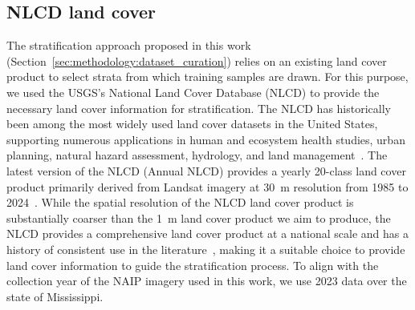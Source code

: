 


\subsection{NLCD land cover}\label{sec:data:nlcd}

The stratification approach proposed in this work (Section~\ref{sec:methodology:dataset_curation}) relies on an existing land cover product to select strata from which training samples are drawn.
For this purpose, we used the USGS's National Land Cover Database (NLCD) to provide the necessary land cover information for stratification. 
The NLCD has historically been among the most widely used land cover datasets in the United States, supporting numerous applications in human and ecosystem health studies, urban planning, natural hazard assessment, hydrology, and land management~\citep{sohlThirtyYearsUS2025}.
The latest version of the NLCD (Annual NLCD) provides a yearly 20-class land cover product primarily derived from Landsat imagery at \SI{30}{\meter} resolution from 1985 to 2024~\citep{unitedstatesgeologicalsurveyAnnualNationalLand2025}.
While the spatial resolution of the NLCD land cover product is substantially coarser than the \SI{1}{\meter} land cover product we aim to produce, the NLCD provides a comprehensive land cover product at a national scale and has a history of consistent use in the literature~\citep{yangNewGenerationUnited2018, blackardMappingUSForest2008,netzelPatternBasedAssessmentLand2015}, making it a suitable choice to provide land cover information to guide the stratification process.
To align with the collection year of the NAIP imagery used in this work, we use 2023 data over the state of Mississippi.




